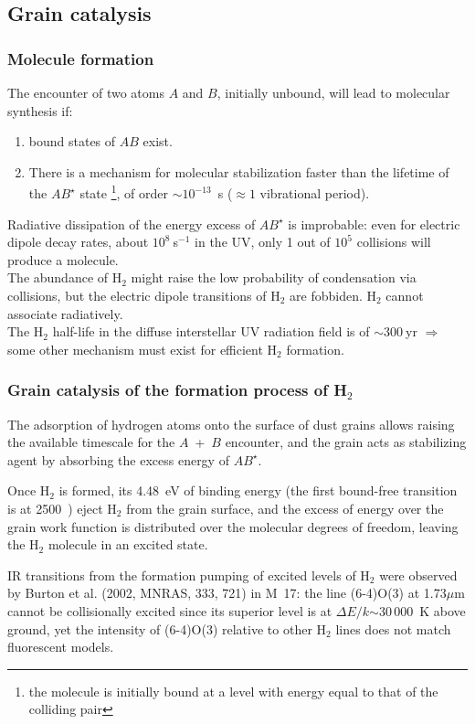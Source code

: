 \subsection{Grain catalysis}

 \begin{frame}\frametitle{Molecule formation}



The encounter of two atoms $A$ and $B$, initially unbound, will lead
to molecular synthesis if:
\begin{enumerate}
\item bound states of $AB$ exist.

\item There is a mechanism for molecular stabilization faster than the
lifetime of the $AB^\star$ state \footnote{the molecule is initially
bound at a level with energy equal to that of the colliding pair}, of
order  $\sim 10^{-13}$~s ($\approx 1$ vibrational period).
\end{enumerate}


Radiative dissipation of the energy excess of $AB^\star$ is
improbable: even for electric dipole decay rates, about
$10^8~$s$^{-1}$ in the UV, only 1 out of $10^5$ collisions will produce
a molecule.\\  

The abundance of H$_2$ might raise the low probability of condensation
via collisions, but the electric dipole transitions of H$_2$ are
fobbiden. H$_2$ cannot associate radiatively.\\

The H$_2$ half-life in the diffuse interstellar UV radiation field is
of $\sim 300~$yr $\Rightarrow$ some other mechanism must exist for
efficient H$_2$ formation. 


\end{frame} \begin{frame}\frametitle{Grain catalysis of the formation process of  H$_2$}

The adsorption of hydrogen atoms onto the surface of dust grains
allows raising the available timescale for the $A$~+~$B$ encounter,
and the grain acts as stabilizing agent by absorbing the excess energy
of $AB^\star$. 

Once H$_2$ is formed, its 4.48~eV of binding energy (the first
bound-free transition is at 2500~\angstrom) eject H$_2$ from the grain
surface, and the excess of energy over the grain work function is
distributed over the molecular degrees of freedom, leaving the H$_2$
molecule in an excited state. 


IR transitions from the formation pumping of excited levels of H$_2$
were observed by Burton et al. (2002, MNRAS, 333, 721) in M~17: the
line (6-4)O(3) at 1.73$\mu$m cannot be collisionally excited since its
superior level is at $\Delta E/k$$\sim$30\,000~K above ground, yet the
intensity of (6-4)O(3) relative to other H$_2$ lines does not match
fluorescent models.

\end{frame} 

